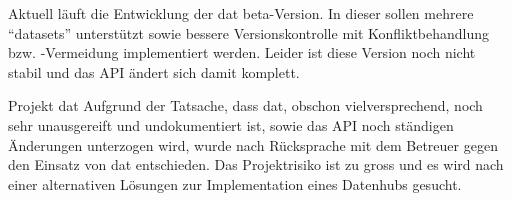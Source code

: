 Aktuell läuft die Entwicklung der dat beta-Version. In dieser sollen mehrere ``datasets'' unterstützt sowie bessere Versionskontrolle mit Konfliktbehandlung bzw. -Vermeidung implementiert werden. Leider ist diese Version noch nicht stabil und das API ändert sich damit komplett.

\begin{decision}[label=dec:dat:fazit]{Projekt dat}
Aufgrund der Tatsache, dass \gls{dat}, obschon vielversprechend, noch sehr unausgereift und undokumentiert ist, sowie das API noch ständigen Änderungen unterzogen wird, wurde nach Rücksprache mit dem Betreuer gegen den Einsatz von \gls{dat} entschieden. Das Projektrisiko ist zu gross und es wird nach einer alternativen Lösungen zur Implementation eines Datenhubs gesucht.
\end{decision}


